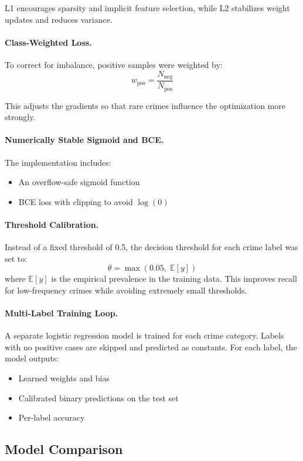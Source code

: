 \documentclass[11pt]{article}
\begin{document}
L1 encourages sparsity and implicit feature selection, while L2 stabilizes weight updates and reduces variance.

\paragraph{Class-Weighted Loss.}
To correct for imbalance, positive samples were weighted by:
\[
w_{\mathrm{pos}} = \frac{N_{\mathrm{neg}}}{N_{\mathrm{pos}}}
\]

This adjusts the gradients so that rare crimes influence the optimization more strongly.

\paragraph{Numerically Stable Sigmoid and BCE.}
The implementation includes:
\begin{itemize}
    \item An overflow-safe sigmoid function
    \item BCE loss with clipping to avoid $\log(0)$
\end{itemize}

\paragraph{Threshold Calibration.}
Instead of a fixed threshold of 0.5, the decision threshold for each crime label was set to:
\[
\theta = \max(0.05,\; \mathbb{E}[y])
\]
where $\mathbb{E}[y]$ is the empirical prevalence in the training data.  
This improves recall for low-frequency crimes while avoiding extremely small thresholds.

\paragraph{Multi-Label Training Loop.}
A separate logistic regression model is trained for each crime category.  
Labels with no positive cases are skipped and predicted as constants.  
For each label, the model outputs:
\begin{itemize}
    \item Learned weights and bias
    \item Calibrated binary predictions on the test set
    \item Per-label accuracy
\end{itemize}

\subsection{Model Comparison}
\end{document}
